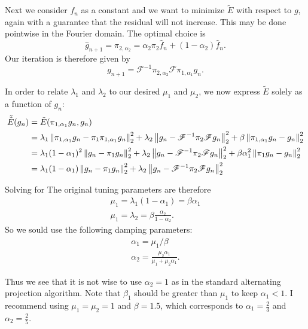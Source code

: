 \documentclass[10pt]{article}
\begin{document}
Next we consider $f_n$ as a constant and we want to minimize $\tilde{E}$ with respect to $g$, again with a guarantee that the residual will not increase. This may be done pointwise in the Fourier domain. The optimal choice is
$$
\hat{g}_{n+1}=\pi_{2,\alpha_2}=\alpha_2\pi_2\hat{f}_n + (1-\alpha_2)\hat{f}_n.$$
Our iteration is therefore given by
$$
g_{n+1}=\mathscr{F}^{-1}\pi_{2,\alpha_2}\mathscr{F}\pi_{1,\alpha_1}g_n.
$$

In order to relate $\lambda_1$ and $\lambda_2$ to our desired $\mu_1$ and $\mu_2$, we now express $\tilde{E}$ solely as a function of $g_n$:
\begin{equation}
\begin{split}
\tilde{\tilde{E}}(g_n) & =\tilde{E}(\pi_{1,\alpha_1}g_n,g_n) \\ 
& =
\lambda_1\left\lVert\pi_{1,\alpha_1}g_n-\pi_1 \pi_{1,\alpha_1}g_n\right\rVert_2^2 + \lambda_2\left\lVert g_n-\mathscr{F}^{-1}\pi_2\mathscr{F} g_n\right\rVert_2^2 + \beta\left\lVert\pi_{1,\alpha_1}g_n-g_n\right\rVert_2^2 \\
& = \lambda_1(1-\alpha_1)^2\left\lVert g_n-\pi_1 g_n\right\rVert_2^2 + \lambda_2 \left\lVert g_n - \mathscr{F}^{-1}\pi_2 \mathscr{F}g_n\right\rVert_2^2 + \beta\alpha_1^2\left\lVert\pi_1 g_n - g_n\right\rVert_2^2 \\
& = \lambda_1(1-\alpha_1)\left\lVert g_n-\pi_1 g_n\right\rVert_2^2 + \lambda_2 \left\lVert g_n - \mathscr{F}^{-1}\pi_2 \mathscr{F}g_n\right\rVert_2^2
\end{split}
\end{equation}


Solving for 
The original tuning parameters are therefore
\begin{equation}
\begin{split}
\mu_1=\lambda_1(1-\alpha_1)=\beta \alpha_1 \\
\mu_1=\lambda_2=\beta \frac{\alpha_2}{1-\alpha_2}.
\end{split}
\end{equation}
So we sould use the following damping parameters:
\begin{equation}
\begin{split}
\alpha_1=\mu_1/\beta \\
\alpha_2=\frac{\mu_2\alpha_1}{\mu_1+\mu_2\alpha_1}.
\end{split}
\end{equation}

Thus we see that it is not wise to use $\alpha_2=1$ as in the standard alternating projection algorithm. Note that $\beta_1$ should be greater than $\mu_1$ to keep $\alpha_1<1$. I recommend using $\mu_1=\mu_2=1$ and $\beta=1.5$, which corresponds to $\alpha_1=\frac{2}{3}$ and $\alpha_2=\frac{2}{5}$. 
\end{document}
